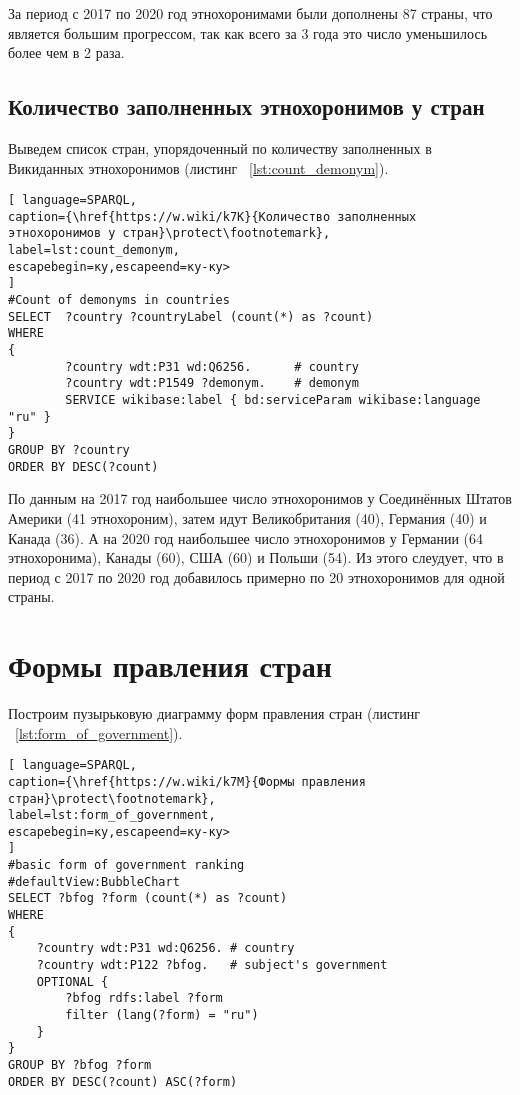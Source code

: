  За период с 2017 по 2020 год этнохоронимами были дополнены 87 страны, что является большим прогрессом, так как всего за 3 года это число уменьшилось более чем в 2 раза.    

\subsection{Количество заполненных этнохоронимов у стран}

Выведем список стран, упорядоченный по количеству заполненных в Викиданных этнохоронимов (листинг ~\ref{lst:count_demonym}).

\begin{lstlisting}[ language=SPARQL, 
caption={\href{https://w.wiki/k7K}{Количество заполненных этнохоронимов у стран}\protect\footnotemark},
label=lst:count_demonym, 
escapebegin=ку,escapeend=ку-ку>
]
#Count of demonyms in countries
SELECT  ?country ?countryLabel (count(*) as ?count)
WHERE
{
		?country wdt:P31 wd:Q6256.      # country
		?country wdt:P1549 ?demonym.    # demonym
		SERVICE wikibase:label { bd:serviceParam wikibase:language "ru" }
}
GROUP BY ?country 
ORDER BY DESC(?count)
\end{lstlisting}


По данным на 2017 год наибольшее число этнохоронимов у Соединённых Штатов Америки (41 этнохороним), затем идут Великобритания (40), Германия (40) и Канада (36). А на 2020 год наибольшее число этнохоронимов у Германии (64 этнохоронима), Канады (60), США (60) и Польши (54). Из этого слеудует, что в период с 2017 по 2020 год добавилось примерно по 20 этнохоронимов для одной страны.


\section{Формы правления стран}

Построим пузырьковую диаграмму форм правления стран (листинг ~\ref{lst:form_of_government}).
\begin{lstlisting}[ language=SPARQL, 
caption={\href{https://w.wiki/k7M}{Формы правления стран}\protect\footnotemark},
label=lst:form_of_government, 
escapebegin=ку,escapeend=ку-ку>
]
#basic form of government ranking
#defaultView:BubbleChart
SELECT ?bfog ?form (count(*) as ?count)
WHERE 
{
	?country wdt:P31 wd:Q6256. # country
	?country wdt:P122 ?bfog.   # subject's government
	OPTIONAL {
		?bfog rdfs:label ?form
		filter (lang(?form) = "ru")
	}
}
GROUP BY ?bfog ?form
ORDER BY DESC(?count) ASC(?form)
\end{lstlisting}


